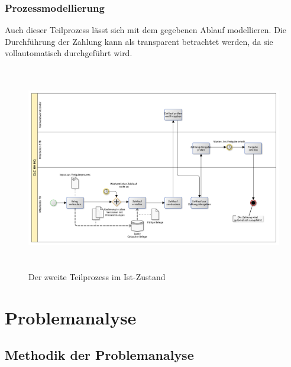 \subsubsection{Prozessmodellierung}

Auch dieser Teilprozess lässt sich mit dem gegebenen Ablauf modellieren. 
Die Durchführung der Zahlung kann als transparent betrachtet werden, da sie vollautomatisch durchgeführt wird.


\begin{figure}[!htb]
\centering
\includegraphics[height=90mm]{images/Prozess_ist_buchung.pdf}
\caption[Teilprozess 2 im Ist-Zustand, BPMN]{Der zweite Teilprozess im Ist-Zustand \protect\footnotemark}
\label{Teilprozess 2 im Ist-Zustand, BPMN}
\end{figure}
\newpage


\section{Problemanalyse}


\subsection{Methodik der Problemanalyse}

